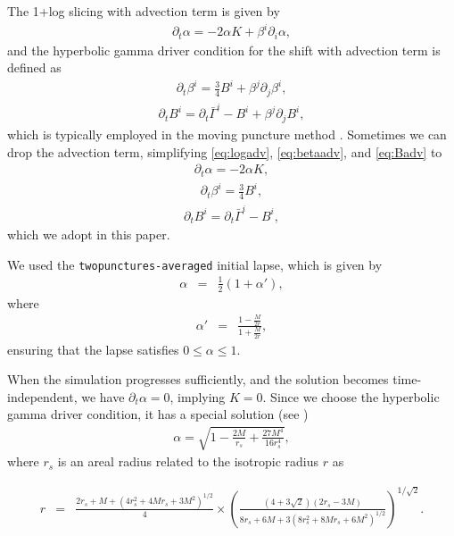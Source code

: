 \documentclass[%
 reprint,
 amsmath,amssymb,
 aps,
 prd,
]{revtex4-2}
\begin{document}
The 1+log slicing with advection term is given by
\begin{eqnarray}
	\label{eq:logadv}
	\partial_t \alpha = -2\alpha K + \beta^i \partial_i \alpha,
\end{eqnarray}
and the hyperbolic gamma driver condition for the shift with advection term is defined as
\begin{eqnarray}
	\label{eq:betaadv}
	\partial_t \beta^i = \frac{3}{4}B^i + \beta^j\partial_j \beta^i,
\end{eqnarray}
\begin{eqnarray}
	\label{eq:Badv}
	\partial_t B^i = \partial_t \bar{\Gamma}^i -B^i + \beta^j \partial_j B^i,
\end{eqnarray}
which is typically employed in the moving puncture method \cite{Campanelli:2005dd, Alcubierre:2002kk}. Sometimes we can drop the advection term, simplifying \eqref{eq:logadv}, \eqref{eq:betaadv}, and \eqref{eq:Badv} to
\begin{eqnarray}
	\label{eq:lognoadv}
	\partial_t \alpha = -2\alpha K,
\end{eqnarray}
\begin{eqnarray}
	\label{eq:betanoadv}
	\partial_t \beta^i = \frac{3}{4}B^i,
\end{eqnarray}
\begin{eqnarray}
	\label{eq:Bnoadv}
	\partial_t B^i = \partial_t \bar{\Gamma}^i -B^i,
\end{eqnarray}
which we adopt in this paper.

We used the \texttt{twopunctures-averaged} initial lapse, which is given by
\begin{eqnarray}
	\alpha &=& \frac{1}{2}(1 + \alpha'),
\end{eqnarray}
where
\begin{eqnarray}
	\alpha' &=& \frac{1 - \frac{M}{2r}}{1 + \frac{M}{2r}},
\end{eqnarray}
ensuring that the lapse satisfies $0 \le \alpha \le 1$.

When the simulation progresses sufficiently, and the solution becomes time-independent, we have $\partial_t \alpha = 0$, implying $K=0$. Since we choose the hyperbolic gamma driver condition, it has a special solution (see \cite{PhysRevD.75.067502, PhysRevD.78.064020})
\begin{eqnarray}
	\label{eq:alpha}
	\alpha = \sqrt{1 - \frac{2M}{r_s} + \frac{27M^4}{16r_s^4}},
\end{eqnarray}
where $r_s$ is an areal radius related to the isotropic radius $r$ as
\begin{widetext}
	\begin{eqnarray}
		\label{eq:rtors}
		r &=& \frac{2r_s + M + (4r_s^2 +4Mr_s+3M^2)^{1/2}}{4}\times \left(\frac{(4+3\sqrt{2})(2r_s - 3M)}{8r_s + 6M + 3 (8r_s^2 + 8Mr_s+6M^2)^{1/2}}\right)^{1/\sqrt{2}}.
	\end{eqnarray}
\end{widetext}
\end{document}
